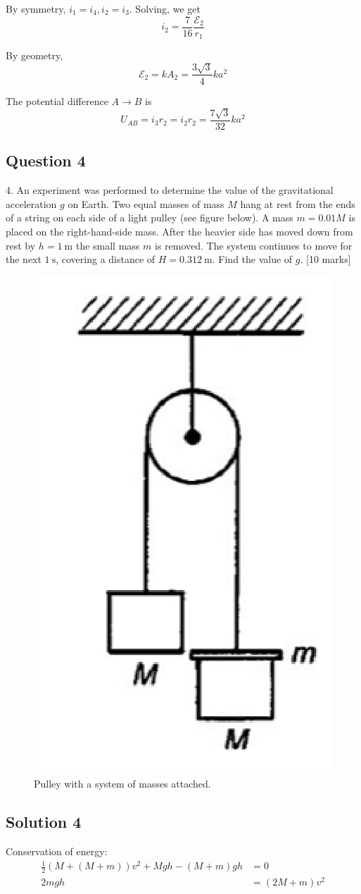 \documentclass{article}
\begin{document}
By symmetry, $i_1=i_4, i_2 = i_3$. Solving, we get
\[i_2 = \frac{7}{16} \frac{\mathcal{E}_2}{r_1}\]

By geometry, \[ \mathcal{E}_2 = kA_2 = \frac{3\sqrt{3}}{4} ka^2\]

The potential difference $A\rightarrow B$ is \[U_{AB} = i_3r_2 = i_2r_2 = \frac{7\sqrt{3}}{32} ka^2\]
\pagebreak

\subsection{Question 4}
4. An experiment was performed to determine the value of the gravitational acceleration $g$ on Earth. Two equal masses of mass $M$ hang at rest from the ends of a string on each side of a light pulley (see figure below). A mass $m=0.01 M$ is placed on the right-hand-side mass. After the heavier side has moved down from rest by $h=1 \mathrm{~m}$ the small mass $m$ is removed. The system continues to move for the next $1 \mathrm{~s}$, covering a distance of $H=0.312 \mathrm{~m} .$ Find the value of $g$. [10 marks]
\begin{figure}
	\centering
	\includegraphics[width=0.5\linewidth]{spho_book_TYS_images/2016q4.png}
	\caption{Pulley with a system of masses attached.}
\end{figure}

\subsection{Solution 4}
Conservation of energy:
\begin{align}
    \frac{1}{2}(M+(M+m))v^2+Mgh-(M+m)gh &= 0 \\
    2mgh &= (2M+m)v^2 
\end{align}
\end{document}
